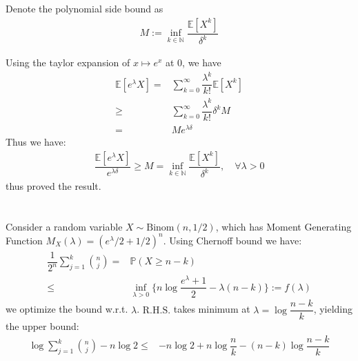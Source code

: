 \documentclass[11pt,a4paper]{ctexart}
\numberwithin{equation}{section}%
\begin{document}
\section{}
Denote the polynomial side bound as 
\begin{align*}
    M:= \mathop{ \inf  }\limits_{k\in \mathbb{N}} \dfrac{ \mathbb{E}\left[ X^k  \right]  }{ \delta ^k }   
\end{align*}

Using the taylor expansion of $ x\mapsto e^x $ at $ 0 $, we have
\begin{align*}
     \mathbb{E}\left[ e^\lambda X \right] =&  \sum_{k=0}^\infty \dfrac{ \lambda ^k }{ k! } \mathbb{E}\left[ X^k \right] \\
     \geq &  \sum_{k=0}^\infty \dfrac{ \lambda ^k }{ k! } \delta ^k M\\
     =& Me^{\lambda \delta } 
\end{align*}
Thus we have: 
\begin{align*}
    \dfrac{\mathbb{E}\left[ e^\lambda X \right]  }{ e^{\lambda \delta }  }  \geq M = \mathop{ \inf  }\limits_{k\in \mathbb{N}} \dfrac{ \mathbb{E}\left[ X^k  \right]  }{ \delta ^k }    ,\quad \forall \lambda >0
\end{align*}
thus proved the result.


\section{}

Consider a random variable $ X\sim \mathrm{Binom}(n,1/2) $, which has Moment Generating Function $ M_X(\lambda ) = (e^\lambda /2 + 1/2)^n $. Using Chernoff bound we have:
\begin{align*}
    \dfrac{ 1 }{ 2^n }\sum_{j=1}^k \binom{n}{j} = & \mathbb{P}\left( X \geq n-k \right) \\
    \leq & \inf _{\lambda >0} \big\{ n \log \dfrac{ e^\lambda +1 }{ 2 } - \lambda (n -k)  \big\} := f(\lambda )
\end{align*}
we optimize the bound w.r.t. $ \lambda $. $  \mathrm{R.H.S.} $ takes minimum at $ \lambda =\log \dfrac{ n-k }{ k }  $, yielding the upper bound:
\begin{align*}
    \log \sum_{j=1}^k \binom{n}{j}- n\log 2\leq & -n\log 2+ n\log \dfrac{ n }{ k } -(n-k)\log \dfrac{ n-k }{ k }
\end{align*}
\end{document}
